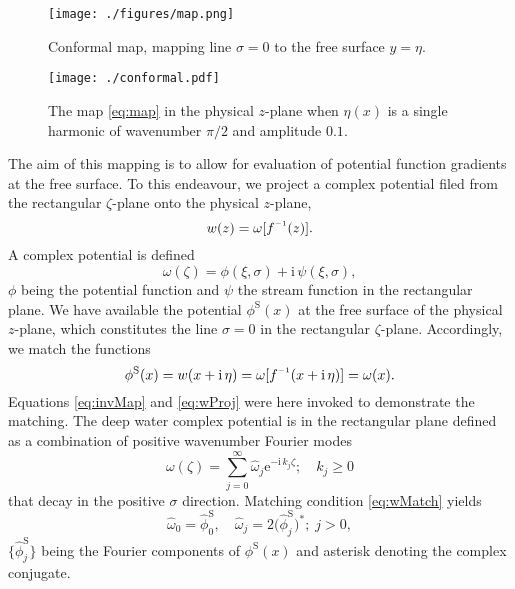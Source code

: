 \documentclass[a4paper,12pt]{article}
\newcommand{\mr}{\mathrm}
\renewcommand{\S}{^\mr{S}}
\newcommand{\ii}{\mr{i}\,}
\newcommand{\ee}{\mr{e}}
\renewcommand{\_}[1]{_\mr{#1}}
\let\Re\relax
\DeclareMathOperator\Re{Re}
\newcommand{\w}{w}
\newcommand{\h}{\hat}
\newcommand{\z}{z}
\newcommand{\x}{x}
\newcommand{\y}{y}
\newcommand{\zz}{\zeta}
\newcommand{\xx}{\xi}
\newcommand{\yy}{\sigma}
\newcommand{\zmap}{f}
\newcommand{\zzmap}{\zmap^{\raisebox{.2ex}{$\scriptscriptstyle-1$}}}
\newcommand{\ww}{\omega}
\renewcommand{\w}{w}
\newcommand{\surf}{\eta}
\begin{document}
\begin{figure}[h!ptb]%
\center
\texttt{[image: ./figures/map.png]}%
\caption{Conformal map, mapping line $\yy=0$ to the free surface $\y=\surf$.}%
\label{fig:map}%
\end{figure}
\begin{figure}[h!ptb]%
\centering
\texttt{[image: ./conformal.pdf]}%
\caption{The map \eqref{eq:map} in the physical $\z$-plane when $\eta(\x)$ is a single harmonic of wavenumber $\pi/2$ and amplitude $0.1$.}%
\label{fig:mapReg}%
\end{figure}

The aim of this mapping is to allow for evaluation of potential function gradients at the free surface. 
To this endeavour, we project a complex potential filed from the rectangular $\zz$-plane onto the physical $\z$-plane,
\begin{equation}
\w(\z) = \ww[\zzmap(\z)].
\label{eq:wProj}
\end{equation}
A complex potential is defined
\[ \ww(\zz) = \phi(\xx,\yy) + \ii \psi(\xx,\yy), \]
$\phi$ being the potential function and $\psi$ the stream function in the rectangular plane.
We have available the potential $\phi\S(\x)$ at the free surface of the physical $\z$-plane, which constitutes the line $\yy=0$ in the rectangular  $\zz$-plane. 
Accordingly, we match the functions
\begin{equation}
\phi\S(\x) = \Re \w(\x+\ii\surf) = \Re \ww[\zzmap(\x+\ii\surf)] = \Re \ww(\x).
\label{eq:wMatch}
\end{equation}
Equations \eqref{eq:invMap} and \eqref{eq:wProj} were here invoked to demonstrate the matching.
The deep water
 complex potential is in the rectangular plane defined as a combination of positive wavenumber Fourier modes
\begin{equation}
\ww(\zz) = \sum_{j=0}^\infty \h\ww_j \ee^{-\ii k_j \zz}; \quad k_j\geq 0
\label{eq:w}
\end{equation} 
that decay in the positive $\yy$ direction.
Matching condition \eqref{eq:wMatch} yields
\begin{equation}
\h\ww_0 = \h\phi_0\S, \quad \h\ww_j = 2\big(\h\phi\S_j\big)^*;\; j>0, 
\label{eq:aj}
\end{equation}
$\{\h\phi\S_j\}$ being the Fourier components of $\phi\S(x)$ and asterisk denoting the complex conjugate.
\end{document}
